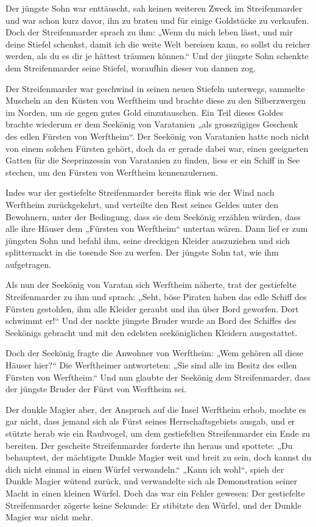 \documentclass[10pt, a4paper, oneside]{book}
\begin{document}
Der jüngste Sohn war enttäuscht, sah keinen weiteren Zweck im Streifenmarder und war schon kurz davor, ihn zu braten und für einige Goldstücke zu verkaufen. Doch der Streifenmarder sprach zu ihm: „Wenn du mich leben lässt, und mir deine Stiefel schenkst, damit ich die weite Welt bereisen kann, so sollst du reicher werden, als du es dir je hättest träumen können.“ Und der jüngste Sohn schenkte dem Streifenmarder seine Stiefel, woraufhin dieser von dannen zog.

Der Streifenmarder war geschwind in seinen neuen Stiefeln unterwegs, sammelte Muscheln an den Küsten von Werftheim und brachte diese zu den Silberzwergen im Norden, um sie gegen gutes Gold einzutauschen. Ein Teil dieses Goldes brachte wiederum er dem Seekönig von Varatanien „als grosszügiges Geschenk des edlen Fürsten von Werftheim“. Der Seekönig von Varatanien hatte noch nicht von einem solchen Fürsten gehört, doch da er gerade dabei war, einen geeigneten Gatten für die Seeprinzessin von Varatanien zu finden, liess er ein Schiff in See stechen, um den Fürsten von Werftheim kennenzulernen.

Indes war der gestiefelte Streifenmarder bereits flink wie der Wind nach Werftheim zurückgekehrt, und verteilte den Rest seines Geldes unter den Bewohnern, unter der Bedingung, dass sie dem Seekönig erzählen würden, dass alle ihre Häuser dem „Fürsten von Werftheim“ untertan wären. Dann lief er zum jüngsten Sohn und befahl ihm, seine dreckigen Kleider auszuziehen und sich splitternackt in die tosende See zu werfen. Der jüngste Sohn tat, wie ihm aufgetragen.

Als nun der Seekönig von Varatan sich Werftheim näherte, trat der gestiefelte Streifenmarder zu ihm und sprach: „Seht, böse Piraten haben das edle Schiff des Fürsten gestohlen, ihm alle Kleider geraubt und ihn über Bord geworfen. Dort schwimmt er!“ Und der nackte jüngste Bruder wurde an Bord des Schiffes des Seekönigs gebracht und mit den edelsten seeköniglichen Kleidern ausgestattet.

Doch der Seekönig fragte die Anwohner von Werftheim: „Wem gehören all diese Häuser hier?“ Die Werftheimer antworteten: „Sie sind alle im Besitz des edlen Fürsten von Werftheim.“ Und nun glaubte der Seekönig dem Streifenmarder, dass der jüngste Bruder der Fürst von Werftheim sei.

Der dunkle Magier aber, der Anspruch auf die Insel Werftheim erhob, mochte es gar nicht, dass jemand sich als Fürst seines Herrschaftsgebiets ausgab, und er stützte herab wie ein Raubvogel, um dem gestiefelten Streifenmarder ein Ende zu bereiten. Der gescheite Streifenmarder forderte ihn heraus und spottete: „Du behauptest, der mächtigste Dunkle Magier weit und breit zu sein, doch kannst du dich nicht einmal in einen Würfel verwandeln.“ „Kann ich wohl“, spieh der Dunkle Magier wütend zurück, und verwandelte sich als Demonstration seiner Macht in einen kleinen Würfel. Doch das war ein Fehler gewesen: Der gestiefelte Streifenmarder zögerte keine Sekunde: Er stibitzte den Würfel, und der Dunkle Magier war nicht mehr.
\end{document}
